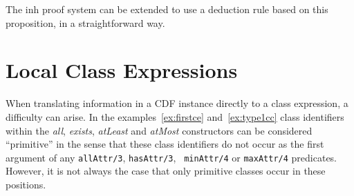 The {\sc inh} proof system can be extended to use a deduction rule
based on this proposition, in a straightforward way.


\section{Local Class Expressions}

When translating information in a CDF instance directly to a class
expression, a difficulty can arise.  In the examples~\ref{ex:firstce}
and~\ref{ex:type1cc} class identifiers within the {\em all}, {\em
exists}, {\em atLeast} and {\em atMost} constructors can be considered
``primitive'' in the sense that these class identifiers do not occur
as the first argument of any {\tt allAttr/3}, {\tt hasAttr/3}, {\tt
minAttr/4} or {\tt maxAttr/4} predicates.  However, it is not always
the case that only primitive classes occur in these positions.

